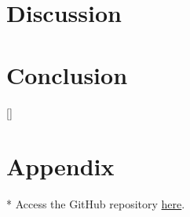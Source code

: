 \documentclass{article}
\begin{document}
\section{Discussion}

\section{Conclusion}

\begin{thebibliography}{9}
    []
\end{thebibliography}

\section{Appendix}
* Access the GitHub repository \href{https://github.com/margheritatonon/approximation-II-assignment}{here}.
\end{document}
